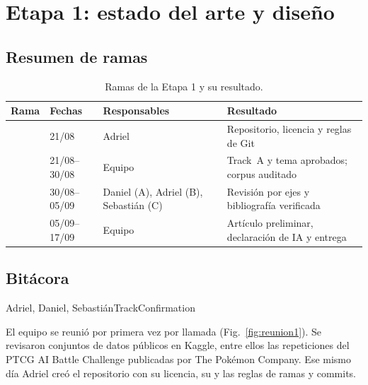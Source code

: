 \section{Etapa 1: estado del arte y dise\~no}
\label{sec:stage1}


\subsection{Resumen de ramas}

\begin{table}[H]
  \centering
  \caption{Ramas de la Etapa 1 y su resultado.}
  \label{tab:stage1summary}
  \footnotesize
  \begin{tabularx}{\textwidth}{@{}l P{2.0cm} P{2.6cm} Y@{}}
    \toprule
    \textbf{Rama} & \textbf{Fechas} & \textbf{Responsables} & \textbf{Resultado}\\
    \midrule
     & 21/08 & Adriel & Repositorio, licencia y reglas de Git\\
     & 21/08--30/08 & Equipo & Track~A y tema aprobados; corpus auditado\\
     & 30/08--05/09 & Daniel (A), Adriel (B), Sebasti\'an (C) & Revisi\'on por ejes y bibliograf\'ia verificada\\
     & 05/09--17/09 & Equipo & Art\'iculo preliminar, declaraci\'on de IA y entrega\\
    \bottomrule
  \end{tabularx}
\end{table}

\subsection{Bit\'acora}

%
       {Adriel, Daniel, Sebasti\'an}{TrackConfirmation}

El equipo se reuni\'o por primera vez por llamada (Fig.~\ref{fig:reunion1}).
Se revisaron conjuntos de datos p\'ublicos en Kaggle, entre ellos las
repeticiones del PTCG AI Battle Challenge publicadas por The Pok\'emon
Company. Ese mismo d\'ia Adriel cre\'o el repositorio con su licencia, su
 y las reglas de ramas y commits.

